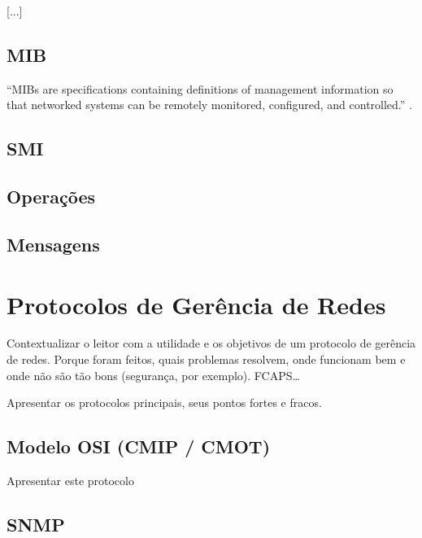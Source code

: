 \documentclass[twoside,english,brazilian]{UNISINOSmonografia}
\begin{document}
[...]

\subsection{MIB}

``MIBs are specifications containing definitions of management information so 
that networked systems can be remotely monitored, configured, and 
controlled.'' \cite{perkins1997understanding}.


\subsection{SMI}
\subsection{Operações}
\subsection{Mensagens}

\section{Protocolos de Gerência de Redes}


Contextualizar o leitor com a utilidade e os objetivos de um protocolo
de gerência de redes. Porque foram feitos, quais problemas resolvem,
onde funcionam bem e onde não são tão bons (segurança, por exemplo).
FCAPS\ldots

Apresentar os protocolos principais, seus pontos fortes e fracos.



\subsection{Modelo OSI (CMIP / CMOT)}

Apresentar este protocolo


\subsection{SNMP}
\end{document}
